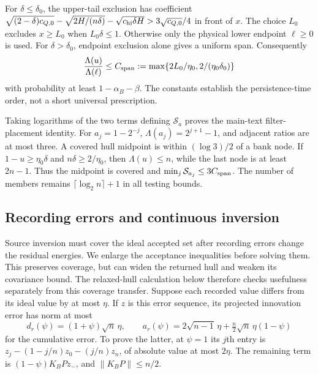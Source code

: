 For $\delta\le\delta_0$, the upper-tail exclusion has coefficient
$\sqrt{(2-\delta)c_{Q,0}}-\sqrt{2H/(n\delta)}-\sqrt{c_{\rm hi}\delta H}>3\sqrt{c_{Q,0}}/4$ in front of $x$. The choice $L_0$ excludes $x\ge L_0$ when $L_0\delta\le1$. Otherwise only the physical lower endpoint $\ell\ge0$ is used. For $\delta>\delta_0$, endpoint exclusion alone gives a uniform span. Consequently
\begin{equation}\label{src16:si-uniform-span}
 \frac{\Lambda(u)}{\Lambda(\ell)}\le
 C_{\rm span}:=\max\{2L_0/\eta_0,2/(\eta_0\delta_0)\}
\end{equation}
with probability at least $1-\alpha_B-\beta$. The constants establish the persistence-time order, not a short universal prescription.

Taking logarithms of the two terms defining $\mathcal S_a$ proves the main-text filter-placement identity. For $a_j=1-2^{-j}$, $\Lambda(a_j)=2^{j+1}-1$, and adjacent ratios are at most three. A covered hull midpoint is within $(\log3)/2$ of a bank node. If $1-u\ge\eta_0\delta$ and $n\delta\ge2/\eta_0$, then $\Lambda(u)\le n$, while the last node is at least $2n-1$. Thus the midpoint is covered and $\min_j\mathcal S_{a_j}\le3C_{\rm span}$. The number of members remains $\lceil\log_2n\rceil+1$ in all testing bounds.

\subsection{Recording errors and continuous inversion}\label{src16:si-rounding}
Source inversion must cover the ideal accepted set after recording errors change the residual energies. We enlarge the acceptance inequalities before solving them. This preserves coverage, but can widen the returned hull and weaken its covariance bound. The relaxed-hull calculation below therefore checks usefulness separately from this coverage transfer.
Suppose each recorded value differs from its ideal value by at most $\eta$. If $z$ is this error sequence, its projected innovation error has norm at most
\begin{equation}\label{src16:si-error-norms}
 d_r(\psi)=(1+\psi)\sqrt n\,\eta,\qquad
 a_r(\psi)=2\sqrt{n-1}\,\eta+\tfrac n2\sqrt n\,\eta(1-\psi)
\end{equation}
for the cumulative error. To prove the latter, at $\psi=1$ its $j$th entry is $z_j-(1-j/n)z_0-(j/n)z_n$, of absolute value at most $2\eta$. The remaining term is $(1-\psi)K_BPz_-$, and $\|K_BP\|\le n/2$.

